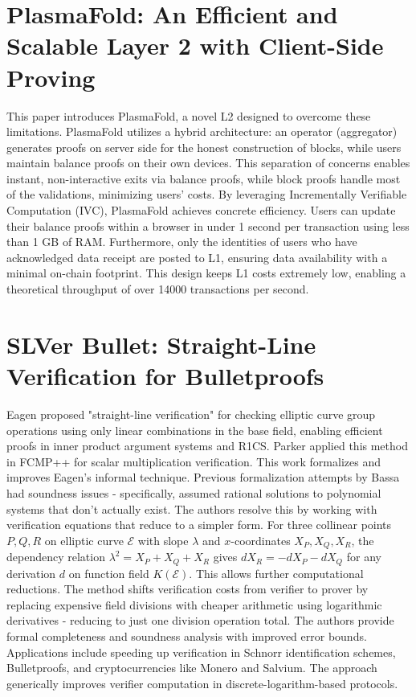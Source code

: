 \documentclass[11pt]{article}
\theoremstyle{definition}
\theoremstyle{remark}
\theoremstyle{plain}
\begin{document}
\section{\cite{PlasmaFold} PlasmaFold: An Efficient and Scalable Layer 2 with Client-Side Proving}
This paper introduces PlasmaFold, a novel L2 designed to overcome these limitations. PlasmaFold utilizes a hybrid architecture: an operator (aggregator) generates proofs on server side for the honest construction of blocks, while users maintain balance proofs on their own devices. This separation of concerns enables instant, non-interactive exits via balance proofs, while block proofs handle most of the validations, minimizing users’ costs. By leveraging Incrementally Verifiable Computation (IVC), PlasmaFold achieves concrete efficiency. Users can update their balance proofs within a browser in under 1 second per transaction using less than 1 GB of RAM. Furthermore, only the identities of users who have acknowledged data receipt are posted to L1, ensuring data availability with a minimal on-chain footprint. This design keeps L1 costs extremely low, enabling a theoretical throughput of over 14000 transactions per second.

\section{\cite{SLVerBullet} SLVer Bullet: Straight-Line Verification for Bulletproofs}
Eagen proposed "straight-line verification" for checking elliptic curve group operations using only linear combinations in the base field, enabling efficient proofs in inner product argument systems and R1CS. Parker applied this method in FCMP++ for scalar multiplication verification. This work formalizes and improves Eagen's informal technique. Previous formalization attempts by Bassa had soundness issues - specifically, assumed rational solutions to polynomial systems that don't actually exist. The authors resolve this by working with verification equations that reduce to a simpler form. For three collinear points $P, Q, R$ on elliptic curve $\mathcal{E}$ with slope $\lambda$ and $x$-coordinates $X_P, X_Q, X_R$, the dependency relation $\lambda^2 = X_P + X_Q + X_R$ gives $dX_R = -dX_P - dX_Q$ for any derivation $d$ on function field $K(\mathcal{E})$. This allows further computational reductions.
The method shifts verification costs from verifier to prover by replacing expensive field divisions with cheaper arithmetic using logarithmic derivatives - reducing to just one division operation total. The authors provide formal completeness and soundness analysis with improved error bounds.
Applications include speeding up verification in Schnorr identification schemes, Bulletproofs, and cryptocurrencies like Monero and Salvium. The approach generically improves verifier computation in discrete-logarithm-based protocols.
\end{document}
